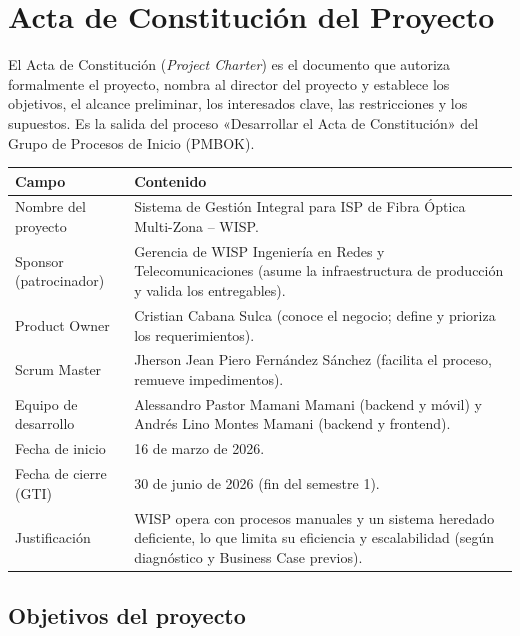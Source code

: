 \section{Acta de Constitución del Proyecto}
\label{sec:acta}

El Acta de Constitución (\textit{Project Charter}) es el documento que autoriza
formalmente el proyecto, nombra al director del proyecto y establece los objetivos,
el alcance preliminar, los interesados clave, las restricciones y los supuestos. Es
la salida del proceso «Desarrollar el Acta de Constitución» del Grupo de Procesos de
Inicio (PMBOK).

\begin{center}
\label{tab:acta}
\begin{tabularx}{\textwidth}{L{4.2cm} X}
\toprule
\textbf{Campo} & \textbf{Contenido} \\
\midrule
Nombre del proyecto & Sistema de Gestión Integral para ISP de Fibra Óptica
Multi-Zona -- WISP. \\
Sponsor (patrocinador) & Gerencia de WISP Ingeniería en Redes y Telecomunicaciones
(asume la infraestructura de producción y valida los entregables). \\
Product Owner & Cristian Cabana Sulca (conoce el negocio; define y prioriza los
requerimientos). \\
Scrum Master & Jherson Jean Piero Fernández Sánchez (facilita el proceso, remueve
impedimentos). \\
Equipo de desarrollo & Alessandro Pastor Mamani Mamani (backend y móvil) y Andrés
Lino Montes Mamani (backend y frontend). \\
Fecha de inicio & 16 de marzo de 2026. \\
Fecha de cierre (GTI) & 30 de junio de 2026 (fin del semestre 1). \\
Justificación & WISP opera con procesos manuales y un sistema heredado deficiente, lo
que limita su eficiencia y escalabilidad (según diagnóstico y Business Case previos). \\
\bottomrule
\end{tabularx}
\end{center}

\subsection{Objetivos del proyecto}

